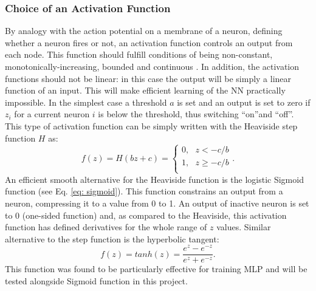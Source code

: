 \documentclass{emulateapj}
\begin{document}
\subsubsection{Choice of an Activation Function}
\label{subsubsec: activation function}

By analogy with the action potential on a membrane of a neuron, defining whether a neuron fires or not, an activation function controls an output from each node. This function should fulfill conditions of being non-constant, monotonically-increasing, bounded and continuous \cite{Morten}. In addition, the activation functions should not be linear: in this case the output will be simply a linear function of an input. This will make efficient learning of the NN practically impossible. In the simplest case a threshold $a$ is set and an output is set to zero if $z_i$ for a current neuron $i$ is below the threshold, thus switching \textquotedblleft on\textquotedblright and \textquotedblleft off\textquotedblright. This type of activation function can be simply written with the Heaviside step function $H$ as:
\begin{equation}\label{eq:heaviside}
    f(z)=H(bz+c)=\begin{cases}
               0, \mbox{ }z<-c/b\\
               1, \mbox{ } z\geq -c/b\\
            \end{cases}.
\end{equation}
An efficient smooth alternative for the Heaviside function is the logistic Sigmoid function (see Eq. \ref{eq: sigmoid}). This function constrains an output from a neuron, compressing it to a value from 0 to 1. An output of inactive neuron is set to 0 (one-sided function) and, as compared to the Heaviside, this activation function has defined derivatives for the whole range of $z$ values. Similar alternative to the step function is the hyperbolic tangent:
\begin{equation}
    f(z)=tanh(z)=\frac{e^z-e^{-z}}{e^z+e^{-z}}.
\end{equation}
This function was found to be particularly effective for training MLP and will be tested alongside Sigmoid function in this project. 
\end{document}
